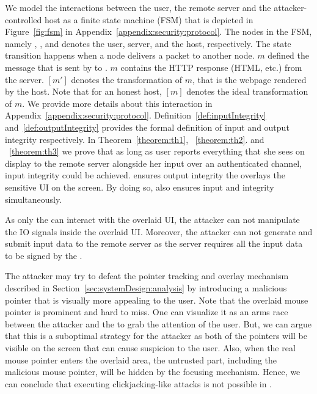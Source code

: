   We model the interactions between the user, the remote server and the attacker-controlled host as a finite state machine (FSM) that is depicted in Figure~\ref{fig:fsm} in Appendix~\ref{appendix:security:protocol}. The nodes in the FSM, namely \user, \server, and \host denotes the user, server, and the host, respectively. The state transition happens when a node delivers a packet to another node. $m$ defined the message that is sent by \server to \host. $m$ contains the HTTP response (HTML, \js etc.) from the server. $[m']$ denotes the transformation of $m$, that is the webpage rendered by the host. Note that for an honest host, $[m]$ denotes the ideal transformation of $m$. We provide more details about this interaction in Appendix~\ref{appendix:security:protocol}.
Definition~\ref{def:inputIntegrity} and~\ref{def:outputIntegrity} provides the formal definition of input and output integrity respectively. In Theorem~\ref{theorem:th1}, ~\ref{theorem:th2}. and ~\ref{theorem:th3} we prove that as long as user reports everything that she sees on display to the remote server alongside her input over an authenticated channel, input integrity could be achieved. \name ensures output integrity the \device overlays the sensitive UI on the screen. By doing so, \name also ensures input and integrity simultaneously. 

 As only the \device can interact with the overlaid UI, the attacker can not manipulate the IO signals inside the overlaid UI. Moreover, the attacker can not generate and submit input data to the remote server as the server requires all the input data to be signed by the \device.

The attacker may try to defeat the \name pointer tracking and overlay mechanism described in Section~\ref{sec:systemDesign:analysis} by introducing a malicious pointer that is visually more appealing to the user. Note that the \device overlaid mouse pointer is prominent and hard to miss. One can visualize it as an arms race between the attacker and the \device to grab the attention of the user. But, we can argue that this is a suboptimal strategy for the attacker as both of the pointers will be visible on the screen that can cause suspicion to the user. Also, when the real mouse pointer enters the overlaid area, the untrusted part, including the malicious mouse pointer, will be hidden by the focusing mechanism. Hence, we can conclude that executing clickjacking-like attacks is not possible in \name.


